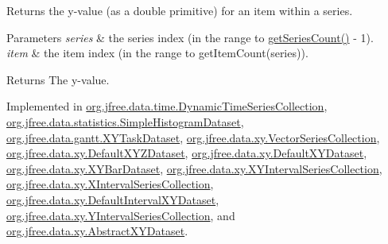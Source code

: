 Returns the y-\/value (as a double primitive) for an item within a series.


\begin{DoxyParams}{Parameters}
{\em series} & the series index (in the range {} to {\ttfamily \mbox{\hyperlink{interfaceorg_1_1jfree_1_1data_1_1general_1_1_series_dataset_a84fe822f5918f941d9de1ed1b73c9f58}{get\+Series\+Count()}} -\/ 1}). \\
\hline
{\em item} & the item index (in the range {} to {\ttfamily get\+Item\+Count(series)}).\\
\hline
\end{DoxyParams}
\begin{DoxyReturn}{Returns}
The y-\/value. 
\end{DoxyReturn}


Implemented in \mbox{\hyperlink{classorg_1_1jfree_1_1data_1_1time_1_1_dynamic_time_series_collection_a9c955683707aa2d6cc74a4fde7d4cf7a}{org.\+jfree.\+data.\+time.\+Dynamic\+Time\+Series\+Collection}}, \mbox{\hyperlink{classorg_1_1jfree_1_1data_1_1statistics_1_1_simple_histogram_dataset_ad84a0d6f8df0d044dfad47ddf28fc7a0}{org.\+jfree.\+data.\+statistics.\+Simple\+Histogram\+Dataset}}, \mbox{\hyperlink{classorg_1_1jfree_1_1data_1_1gantt_1_1_x_y_task_dataset_a5e6056162609e273bff52db664ee8bb2}{org.\+jfree.\+data.\+gantt.\+X\+Y\+Task\+Dataset}}, \mbox{\hyperlink{classorg_1_1jfree_1_1data_1_1xy_1_1_vector_series_collection_a418ee78010207ee552d5c2e74a031b31}{org.\+jfree.\+data.\+xy.\+Vector\+Series\+Collection}}, \mbox{\hyperlink{classorg_1_1jfree_1_1data_1_1xy_1_1_default_x_y_z_dataset_a1d085e3b2a18c6af96b15fd78d4ae9e8}{org.\+jfree.\+data.\+xy.\+Default\+X\+Y\+Z\+Dataset}}, \mbox{\hyperlink{classorg_1_1jfree_1_1data_1_1xy_1_1_default_x_y_dataset_a2ac3a1e3295eaa3aacb36b210926fbf4}{org.\+jfree.\+data.\+xy.\+Default\+X\+Y\+Dataset}}, \mbox{\hyperlink{classorg_1_1jfree_1_1data_1_1xy_1_1_x_y_bar_dataset_ad5f518543e018a6bc34cfe303bc9fa69}{org.\+jfree.\+data.\+xy.\+X\+Y\+Bar\+Dataset}}, \mbox{\hyperlink{classorg_1_1jfree_1_1data_1_1xy_1_1_x_y_interval_series_collection_a2dbffee80faab6bf16da287aecd32685}{org.\+jfree.\+data.\+xy.\+X\+Y\+Interval\+Series\+Collection}}, \mbox{\hyperlink{classorg_1_1jfree_1_1data_1_1xy_1_1_x_interval_series_collection_a6443d84ede22abd2c56368b16509b076}{org.\+jfree.\+data.\+xy.\+X\+Interval\+Series\+Collection}}, \mbox{\hyperlink{classorg_1_1jfree_1_1data_1_1xy_1_1_default_interval_x_y_dataset_a924e1f58152217e3648fbe6cdc64bf34}{org.\+jfree.\+data.\+xy.\+Default\+Interval\+X\+Y\+Dataset}}, \mbox{\hyperlink{classorg_1_1jfree_1_1data_1_1xy_1_1_y_interval_series_collection_a741571e5d370b9f083cea6419b417954}{org.\+jfree.\+data.\+xy.\+Y\+Interval\+Series\+Collection}}, and \mbox{\hyperlink{classorg_1_1jfree_1_1data_1_1xy_1_1_abstract_x_y_dataset_a2a37653acb0e32c2dbf89fd9ca8695fe}{org.\+jfree.\+data.\+xy.\+Abstract\+X\+Y\+Dataset}}.



